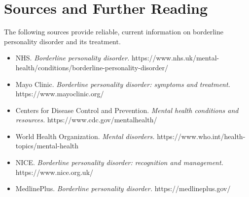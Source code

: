 \section*{Sources and Further Reading}
The following sources provide reliable, current information on borderline personality disorder and its treatment.
\begin{itemize}
    \item NHS. \textit{Borderline personality disorder.} https://www.nhs.uk/mental-health/conditions/borderline-personality-disorder/
    \item Mayo Clinic. \textit{Borderline personality disorder: symptoms and treatment.} https://www.mayoclinic.org/
    \item Centers for Disease Control and Prevention. \textit{Mental health conditions and resources.} https://www.cdc.gov/mentalhealth/
    \item World Health Organization. \textit{Mental disorders.} https://www.who.int/health-topics/mental-health
    \item NICE. \textit{Borderline personality disorder: recognition and management.} https://www.nice.org.uk/
    \item MedlinePlus. \textit{Borderline personality disorder.} https://medlineplus.gov/
\end{itemize}
